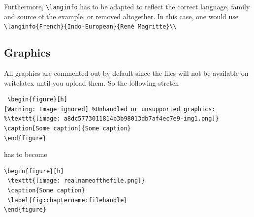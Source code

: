 Furthermore, \verb+\langinfo+ has to be adapted to reflect the correct language, family and source of the example, or removed altogether. In this case, one would use  \verb+\langinfo{French}{Indo-European}{René Magritte}\\+

\subsection{Graphics}
All graphics are commented out by default since the files will not be available on writelatex until you upload them. So the following stretch

\begin{verbatim}
 \begin{figure}[h]
[Warning: Image ignored] %Unhandled or unsupported graphics:
%\texttt{[image: a8dc5773011814b3b98013db7af4ec7e9-img1.png]}
\caption[Some caption]{Some caption}
\end{figure}
\end{verbatim}

has to become


\begin{verbatim}
\begin{figure}[h]
 \texttt{[image: realnameofthefile.png]}
 \caption{Some caption}
 \label{fig:chaptername:filehandle}
\end{figure}
\end{verbatim}
